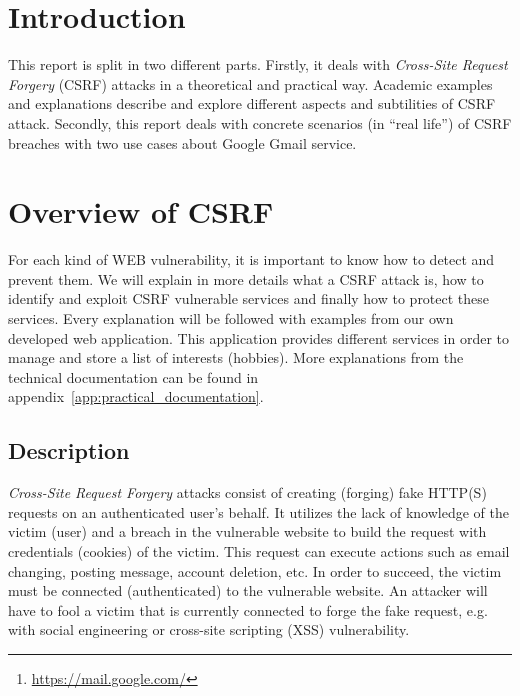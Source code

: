 \documentclass[a4paper,11pt,openany]{report}
\newcommand{\csrf}{\textit{Cross-Site Request Forgery}}
\begin{document}
\begin{abstract}
  In our second part we focused our attention on concrete applications of CSRF vulnerabilities. 
  Lots of companies were affected in the past and we decided to deal with Google's well-known 
  stories about CSRF. Two different vulnerabilities were discovered in 2007 concerning 
  Google's \footnote{\url{https://mail.google.com/}} email service Gmail.
  
  Finally, we implemented a small webapp with different services, either vulnerable or protected, 
  from CSRF attack. This webapp featured an attacker website (both developed from scratch), 
  the outline of different practical examples of the attack and different ways to prevent it.
  \end{abstract}
\restoregeometry

\tableofcontents{} %
\clearpage %
\setcounter{page}{1} %

  \section{Introduction}
  This report is split in two different parts. Firstly, it deals with \csrf{} (CSRF) attacks in 
  a theoretical and practical way. Academic examples and explanations describe and explore 
  different aspects and subtilities of CSRF attack. Secondly, this report deals with concrete 
  scenarios (in ``real life'') of CSRF breaches with two use cases about Google Gmail service.

  \section{Overview of CSRF}
  For each kind of WEB vulnerability, it is important to know how to detect and prevent them. 
  We will explain in more details what a CSRF attack is, how to identify and exploit CSRF 
  vulnerable services and finally how to protect these services. 
  Every explanation will be followed with examples from our own developed web application. 
  This application provides different services in order to manage and store a list of 
  interests (hobbies). More explanations from the technical documentation can be found 
  in appendix~\ref{app:practical_documentation}.
  
  \subsection{Description}
  \csrf{} attacks consist of creating (forging) fake HTTP(S) requests on an authenticated 
  user's behalf. It utilizes the lack of knowledge of the victim (user) and a breach in 
  the vulnerable website to build the request with credentials (cookies) of the victim. This 
  request can execute actions such as email changing, posting message, account deletion, etc.
  In order to succeed, the victim must be connected (authenticated) to the vulnerable website. 
  An attacker will have to fool a victim that is currently connected to forge the fake request, 
  e.g. with social engineering or cross-site scripting (XSS)\cite{wikipedia_xss} vulnerability.
  
\end{document}
